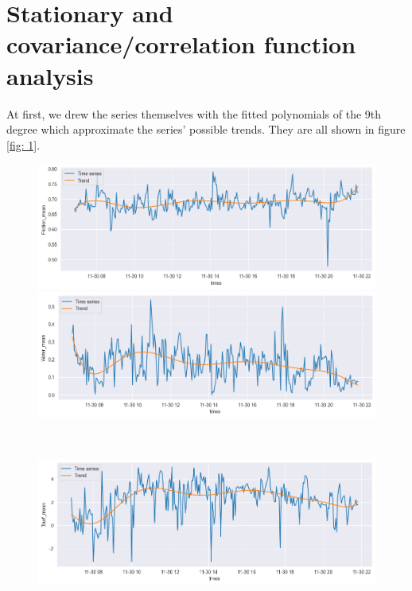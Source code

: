 \documentclass[12pt, bachelor, substylefile = algo_title.rtx]{disser}
\theoremstyle{definition}
\begin{document}
\section{Stationary and covariance/correlation function analysis}
At first, we drew the series themselves with the fitted polynomials of the 9th degree which approximate the series' possible trends. They are all shown in figure \ref{fig: 1}.

\begin{figure}[!h]
   \begin{minipage}{.48\textwidth}
     \includegraphics[width=\linewidth]{trend1}
   \end{minipage} \hfill
\begin{minipage}{.48\textwidth}
     \includegraphics[width=\linewidth]{trend2}
   \end{minipage}\\
\begin{minipage}{.48\textwidth}
     \includegraphics[width=\linewidth]{trend3}
   \end{minipage} \hfill
\begin{minipage}{.48\textwidth}

\end{minipage}
\end{figure}
\end{document}
